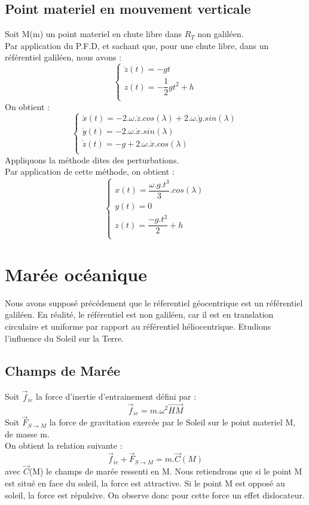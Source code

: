 \subsection{Point materiel en mouvement verticale}
Soit M(m) un point materiel en chute libre dans $R_T$ non galiléen.\\
Par application du P.F.D, et sachant que, pour une chute libre, dans un référentiel galiléen, nous avons : 
$$\left\{\begin{array}{l}
   \mathring{z}(t) = -gt\\
   z(t) = -\dfrac{1}{2}gt^2+h\\
  \end{array}\right.$$
On obtient : 
$$\left\{\begin{array}{l}
   \mathring{x}\mathring{}(t) = -2.\omega.\mathring{z}.cos(\lambda) + 2.\omega.\mathring{y}.sin(\lambda)\\
   \mathring{y}\mathring{}(t) = -2.\omega.\mathring{x}.sin(\lambda)\\
   \mathring{z}\mathring{}(t) = -g + 2.\omega.\mathring{x}.cos(\lambda)\\
  \end{array}\right.$$
Appliquons la méthode dites des perturbations.\\
Par application de cette méthode, on obtient : 
$$\left\{\begin{array}{l}
   x(t) = \dfrac{\omega.g.t^3}{3}.cos(\lambda) \\
   y(t) = 0\\
   z(t) = \dfrac{-g.t^2}{2} + h\\
  \end{array}\right.$$
\section{Marée océanique}
Nous avons supposé précédement que le réferentiel géocentrique est un référentiel galiléen. En réalité, le référentiel est non galiléen, car il est en translation circulaire et uniforme par rapport au référentiel héliocentrique. Etudions l'influence du Soleil sur la Terre.\\
\subsection{Champs de Marée}
Soit $\overrightarrow{f}_{ie}$ la force d'inertie d'entrainement défini par : 
$$\overrightarrow{f}_{ie} = m.\omega^2\overrightarrow{HM}$$
Soit $\overrightarrow{F}_{S\rightarrow M}$ la force de gravitation exercée par le Soleil sur le point materiel M, de masse m.\\
On obtient la relation suivante : 
$$\overrightarrow{f}_{ie} + \overrightarrow{F}_{S \rightarrow M} = m.\overrightarrow{C}(M)$$
avec $\overrightarrow{C}$(M) le champs de marée ressenti en M.
Nous retiendrons que si le point M est situé en face du soleil, la force est attractive. Si le point M est opposé au soleil, la force est répulsive. On observe donc pour cette force un effet dislocateur. 

